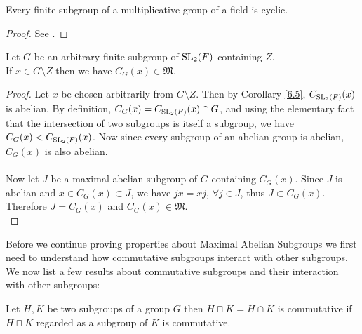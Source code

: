 \begin{lemma}
  \label{coprime_card_fin_subgroup_of_inj_hom_group_iso_units}
  \leanok
Every finite subgroup of a multiplicative group of a field is cyclic.
\end{lemma}

\begin{proof} 
  See \cite[p.41]{suzuki}.
\end{proof}

\begin{theorem}
  \label{MaximalAbelianSubgroup.centralizer_meet_G_in_MaximalAbelianSubgroups_of_noncentral}
  \leanok 
  Let $G$ be an arbitrary finite subgroup of $\operatorname{SL}_2(F)$ containing $Z$. \\
If $x \in G \! \setminus \! Z$ then we have $C_G(x) \in \mathfrak{M}$. \vspace{3mm} \\
\end{theorem}
\begin{proof}
  Let $x$ be chosen arbitrarily from $G \! \setminus \! Z$. Then by Corollary \ref{6.5}, $C_{\operatorname{SL}_2(F)}(x)$ is abelian. By definition, $C_G(x) = C_{\operatorname{SL}_2(F)}(x) \cap G$, and using the elementary fact that the intersection of two subgroups is itself a subgroup, we have $C_G(x) < C_{\operatorname{SL}_2(F)}(x)$. Now since every subgroup of an abelian group is abelian, $C_G(x)$ is also abelian. \\
  \\
  Now let $J$ be a maximal abelian subgroup of $G$ containing $C_G(x)$. Since $J$ is abelian and $x \in C_G(x) \subset J$, we have $jx=xj$, $\forall j \in J$, thus $J \subset C_G(x)$. Therefore $J=C_G(x)$ and $C_G(x) \in \mathfrak{M}$. \\
\end{proof}

Before we continue proving properties about Maximal Abelian Subgroups we first need to understand how commutative subgroups interact with other subgroups. 
We now list a few results about commutative subgroups and their interaction with other subgroups:

\begin{remark}
\label{IsCommutative_of_IsCommutative_subgroupOf}
\leanok
Let $H, K$ be two subgroups of a group $G$ then $H \sqcap K = H \cap K$ is commutative if $H \sqcap K$ regarded as a subgroup of $K$ is commutative.
\end{remark}

